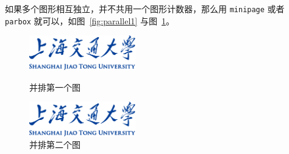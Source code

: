如果多个图形相互独立，并不共用一个图形计数器，那么用 \texttt{minipage} 或者
\texttt{parbox} 就可以，如图~\ref{fig:parallel1} 与图~\ref{fig:parallel2}。

\begin{figure}[ht]
\begin{minipage}{0.48\textwidth}
  \centering
  \includegraphics[height=1.5cm]{figure/name-blue.pdf}
  \caption{并排第一个图}
  \label{fig:parallel1}
\end{minipage}\hfill
\begin{minipage}{0.48\textwidth}
  \centering
  \includegraphics[height=1.5cm]{figure/name-blue.pdf}
  \caption{并排第二个图}
  \label{fig:parallel2}
\end{minipage}
\end{figure}